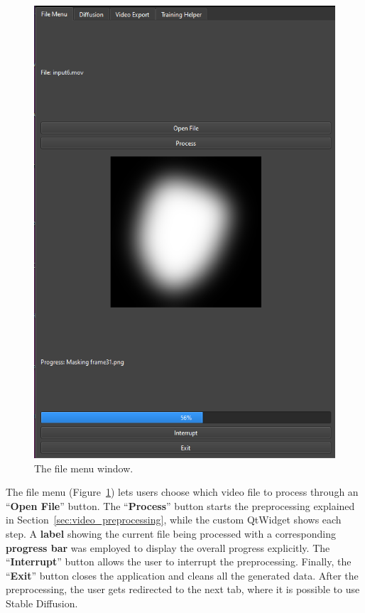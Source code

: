 \documentclass[sn-mathphys,Numbered]{sn-jnl}
\theoremstyle{thmstyleone}%
\theoremstyle{thmstyletwo}%
\theoremstyle{thmstylethree}%
\begin{document}
\begin{figure}[b]
	\centering
	\includegraphics[scale=0.45, keepaspectratio]{img/project_img/file-window.png}
	\caption{The file menu window.}
	\label{fig:file-menu}
\end{figure}


The file menu (Figure~\ref{fig:file-menu}) lets users choose which video file to process through 
an ``\textbf{Open File}'' button. 
The ``\textbf{Process}'' button starts the preprocessing explained in Section~\ref{sec:video_preprocessing}, 
while the custom QtWidget shows each step. 
A \textbf{label} showing the current file being processed with a corresponding \textbf{progress bar} 
was employed to display the overall progress explicitly. The ``\textbf{Interrupt}'' button allows the user to interrupt the preprocessing.  Finally, the ``\textbf{Exit}'' button closes the application and cleans all the generated data. 
After the preprocessing, the user gets redirected to the next tab, where it is possible to use Stable Diffusion. 
\end{document}
